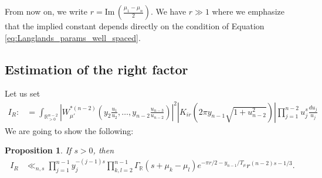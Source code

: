 \documentclass[11pt, oneside]{amsart}
\theoremstyle{plain}
\newtheorem{prop}[theorem]{Proposition}
\theoremstyle{remark}
\newcommand{\R}{\mathbb{R}}
\newcommand{\abs}[1]{\left|#1\right|}
\newcommand{\im}{\mathrm{Im}\,}
\begin{document}
From now on, we write $r=\im(\frac{\mu_1-\mu_n}2)$. We have $r\gg1$ where we emphasize that the implied constant 
depends directly on the condition of Equation \eqref{eq:Langlands_params_well_spaced}.


\subsection{Estimation of the right factor}
Let us set
\begin{align*}
I_R:&=
\int_{\R_{>0}^{n-2}}
\abs{W_{\mu'}^{\ast(n-2)}\left(y_2\frac{u_1}{u_2},\dots,y_{n-2}\frac{u_{n-3}}{u_{n-2}}\right)}^2
\abs{K_{ir}\left(2\pi y_{n-1}\sqrt{1+u_{n-2}^2}\right)}
    \prod_{j=1}^{n-2}u_j^{s}\frac{du_j}{u_j}
\end{align*}
We are going to show the following:
\begin{prop}\label{prop:right_factor}
    If $s>0$, then
\begin{align*}
I_R&\ll_{n,s}
\prod_{j=1}^{n-1}y_j^{-(j-1)s}\prod_{k,l=2}^{n-1}\Gamma_\R(s+\mu_k-\mu_l)e^{-\pi r/2-y_{n-1}/T_\mu}r^{(n-2)s-1/3}.
\end{align*}
\end{prop}
\end{document}
